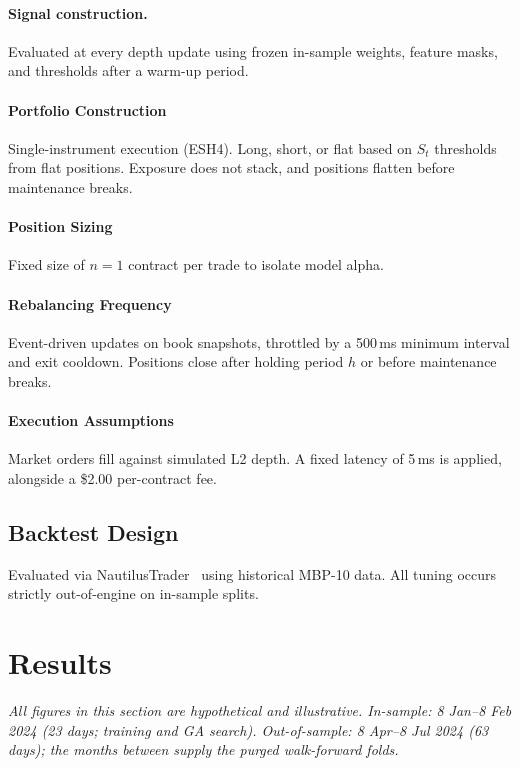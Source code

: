 \documentclass[11pt,letterpaper]{article}
\newcommand{\hyponote}[1]{{\footnotesize\itshape #1\par}}
\begin{document}
\paragraph{Signal construction.} Evaluated at every depth update using frozen in-sample weights, feature masks, and thresholds after a warm-up period.
 
\paragraph{Portfolio Construction}
Single-instrument execution (ESH4). Long, short, or flat based on $S_t$ thresholds from flat positions. Exposure does not stack, and positions flatten before maintenance breaks.
 
\paragraph{Position Sizing}
Fixed size of $n=1$ contract per trade to isolate model alpha.
 
\paragraph{Rebalancing Frequency} Event-driven updates on book snapshots, throttled by a 500\,ms minimum interval and exit cooldown. Positions close after holding period $h$ or before maintenance breaks.
 
\paragraph{Execution Assumptions}
Market orders fill against simulated L2 depth. A fixed latency of 5\,ms is applied, alongside a \$2.00 per-contract fee.
 
\subsection{Backtest Design}
Evaluated via NautilusTrader~\cite{nautilus} using historical MBP-10 data. All tuning occurs strictly out-of-engine on in-sample splits.
 
\section{Results}\label{sec:results}
\hyponote{All figures in this section are hypothetical and illustrative. In-sample: 8 Jan--8 Feb 2024 (23 days; training and GA search). Out-of-sample: 8 Apr--8 Jul 2024 (63 days); the months between supply the purged walk-forward folds.}
\end{document}
